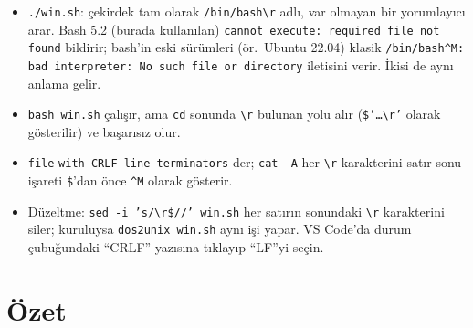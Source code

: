\documentclass[11pt,a4paper]{article}
\newcommand{\cmd}[1]{\texttt{#1}}
\begin{document}
\begin{itemize}
  \item \texttt{./win.sh}: çekirdek tam olarak \texttt{/bin/bash\textbackslash r} adlı, var olmayan bir yorumlayıcı arar. Bash 5.2 (burada kullanılan) \texttt{cannot execute: required file not found} bildirir; bash'in eski sürümleri (ör.\ Ubuntu 22.04) klasik \texttt{/bin/bash\^{}M: bad interpreter: No such file or directory} iletisini verir. İkisi de aynı anlama gelir.
  \item \texttt{bash win.sh} çalışır, ama \cmd{cd} sonunda \texttt{\textbackslash r} bulunan yolu alır (\texttt{\$'\ldots\textbackslash r'} olarak gösterilir) ve başarısız olur.
  \item \cmd{file} \texttt{with CRLF line terminators} der; \cmd{cat -A} her \texttt{\textbackslash r} karakterini satır sonu işareti \texttt{\$}'dan önce \texttt{\^{}M} olarak gösterir.
  \item Düzeltme: \cmd{sed -i 's/\textbackslash r\$//' win.sh} her satırın sonundaki \texttt{\textbackslash r} karakterini siler; kuruluysa \cmd{dos2unix win.sh} aynı işi yapar. VS Code'da durum çubuğundaki “CRLF” yazısına tıklayıp “LF”yi seçin.
\end{itemize}

\section{Özet}
\end{document}
